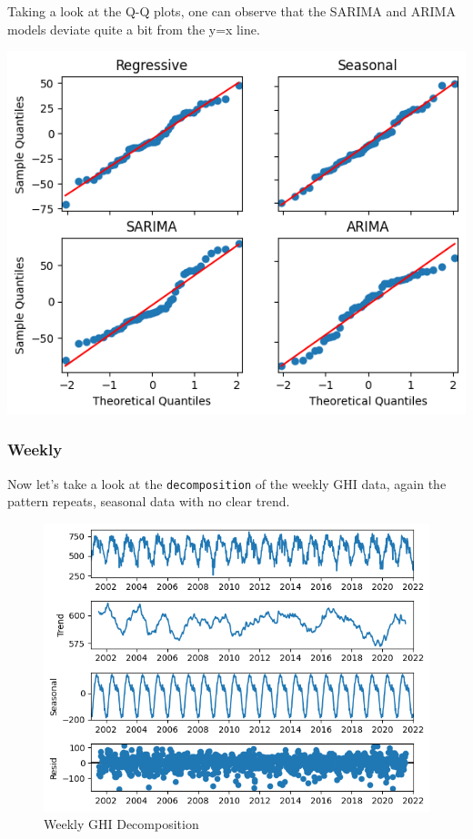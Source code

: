 \documentclass[a4paper,12pt]{article}
\begin{document}
Taking a look at the Q-Q plots, one can observe that the SARIMA and ARIMA models deviate quite a bit from the y=x line.

\begin{center}
\includegraphics[width=0.8\linewidth]{./images/bhadla/monthlyQQ.png}
\end{center}
\pagebreak

\subsubsection{Weekly}
\label{sec:org4041749}
Now let's take a look at the \texttt{decomposition} of the weekly GHI data, again the pattern repeats, seasonal data with no clear trend.

\begin{figure}[htbp]
\centering
\includegraphics[width=1.0\textwidth]{./images/bhadla/weeklyDecomp.png}
Weekly GHI Decomposition
\end{figure}
\end{document}
